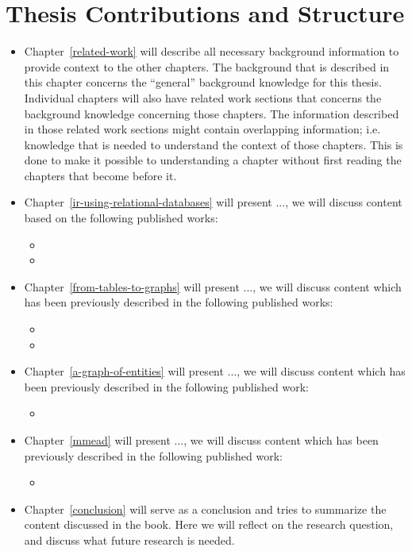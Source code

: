 \section{Thesis Contributions and Structure}

\begin{itemize}
\item Chapter~\ref{related-work} will describe all necessary background information to provide context to the other chapters. The background that is described in this chapter concerns the ``general'' background knowledge for this thesis. Individual chapters will also have related work sections that concerns the background knowledge concerning those chapters. The information described in those related work sections might contain overlapping information; i.e. knowledge that is needed to understand the context of those chapters. This is done to make it possible to understanding a chapter without first reading the chapters that become before it. 

\item Chapter~\ref{ir-using-relational-databases} will present ..., we will discuss content based on the following published works: 
{
	\scriptsize
	\begin{itemize}
		\item {}
		\item {}
	\end{itemize}
}

\item Chapter~\ref{from-tables-to-graphs} will present ..., we will discuss content which has been previously described in the following published works:
{
	\scriptsize
	\begin{itemize}
		\item {}
		\item {}
	\end{itemize}
}

\item Chapter~\ref{a-graph-of-entities} will present ..., we will discuss content which has been previously described in the following published work: 
{
	\scriptsize
	\begin{itemize}
		\item {}
	\end{itemize}
}

\item Chapter~\ref{mmead} will present ..., we will discuss content which has been previously described in the following published work: {
\scriptsize
	\begin{itemize}
		\item {}
	\end{itemize}
}


\item Chapter~\ref{conclusion} will serve as a conclusion and tries to summarize the content discussed in the book. Here we will reflect on the research question, and discuss what future research is needed.
\end{itemize}



